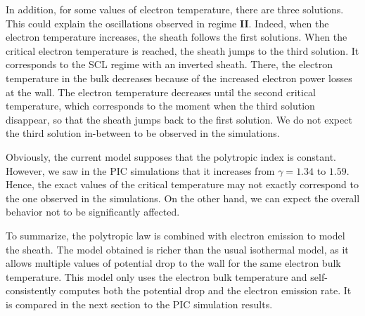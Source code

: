In addition, for some values of electron temperature, there are three solutions.
This could explain the oscillations observed in regime {\bf II}.
Indeed, when the electron temperature increases, the sheath follows the first solutions.
When the critical electron temperature is reached, the sheath jumps to the third solution.
It corresponds to the \ac{SCL} regime with an inverted sheath.
There, the electron temperature in the bulk decreases because of the increased electron power losses at the wall.
The electron temperature decreases until the second critical temperature, which corresponds to the moment when the third solution disappear, so that the sheath jumps back to the first solution.
We do not expect the third solution in-between to be observed in the simulations.

Obviously, the current model supposes that the polytropic index is constant.
However, we saw in the \ac{PIC} simulations that it increases from $\gamma = 1.34$ to $1.59$.
Hence, the exact values of the critical temperature may not exactly correspond to the one observed in the simulations.
On the other hand, we can expect the overall behavior not to be significantly affected.

\vspace{1em}
To summarize, the polytropic law is combined with electron emission to model the sheath.
The model obtained is richer than the usual isothermal model, as it allows multiple values of potential drop to the wall for the same electron bulk temperature.
This model only uses the electron bulk temperature and self-consistently computes both the potential drop and the electron emission rate.
It is compared in the next section to the \ac{PIC} simulation results.


\let\rightmark=\oldrightmark
